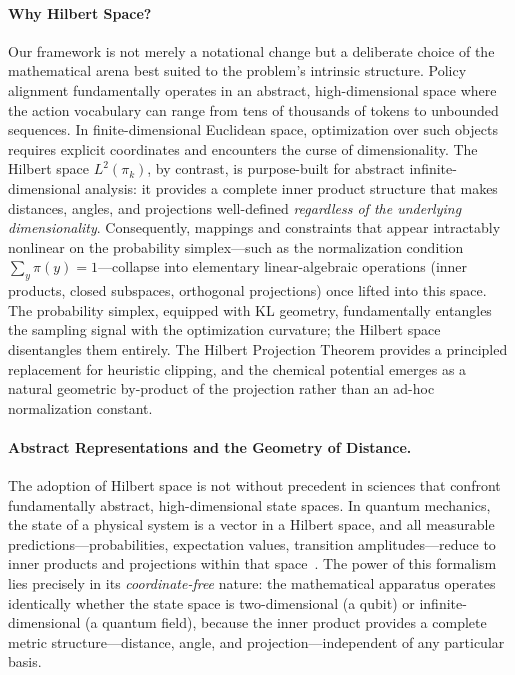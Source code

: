\documentclass[11pt]{article}
\theoremstyle{definition}
\theoremstyle{remark}
\newcommand{\pik}{\pi_k}
\begin{document}
\paragraph{Why Hilbert Space?}
Our framework is not merely a notational change but a deliberate choice of the mathematical arena best suited to the problem's intrinsic structure. Policy alignment fundamentally operates in an abstract, high-dimensional space where the action vocabulary can range from tens of thousands of tokens to unbounded sequences. In finite-dimensional Euclidean space, optimization over such objects requires explicit coordinates and encounters the curse of dimensionality. The Hilbert space $L^2(\pik)$, by contrast, is purpose-built for abstract infinite-dimensional analysis: it provides a complete inner product structure that makes distances, angles, and projections well-defined \emph{regardless of the underlying dimensionality}. Consequently, mappings and constraints that appear intractably nonlinear on the probability simplex---such as the normalization condition $\sum_y \pi(y) = 1$---collapse into elementary linear-algebraic operations (inner products, closed subspaces, orthogonal projections) once lifted into this space. The probability simplex, equipped with KL geometry, fundamentally entangles the sampling signal with the optimization curvature; the Hilbert space disentangles them entirely. The Hilbert Projection Theorem provides a principled replacement for heuristic clipping, and the chemical potential emerges as a natural geometric by-product of the projection rather than an ad-hoc normalization constant.

\paragraph{Abstract Representations and the Geometry of Distance.}
The adoption of Hilbert space is not without precedent in sciences that confront fundamentally abstract, high-dimensional state spaces. In quantum mechanics, the state of a physical system is a vector in a Hilbert space, and all measurable predictions---probabilities, expectation values, transition amplitudes---reduce to inner products and projections within that space~\cite{VonNeumann1932}. The power of this formalism lies precisely in its \emph{coordinate-free} nature: the mathematical apparatus operates identically whether the state space is two-dimensional (a qubit) or infinite-dimensional (a quantum field), because the inner product provides a complete metric structure---distance, angle, and projection---independent of any particular basis.
\end{document}
